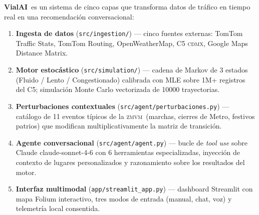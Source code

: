 \documentclass[11pt,a4paper]{article}
\newcommand{\VialAI}{\textbf{\textcolor{vialTeal}{Vial}\textcolor{vialAmber}{AI}}}
\newcommand{\ZMVM}{\textsc{zmvm}}
\newcommand{\CDMX}{\textsc{cdmx}}
\begin{document}
\VialAI\ es un sistema de cinco capas que transforma datos de tráfico
en tiempo real en una recomendación conversacional:

\begin{keybox}
\begin{enumerate}
\item \textbf{Ingesta de datos} (\texttt{src/ingestion/}) ---
cinco fuentes externas: TomTom Traffic Stats, TomTom Routing,
OpenWeatherMap, C5 \CDMX, Google Maps Distance Matrix.
\item \textbf{Motor estocástico} (\texttt{src/simulation/}) ---
cadena de Markov de 3 estados (Fluido / Lento / Congestionado)
calibrada con MLE sobre \num{1}M+ registros del C5; simulación
Monte Carlo vectorizada de \num{10000} trayectorias.
\item \textbf{Perturbaciones contextuales} (\texttt{src/agent/perturbaciones.py}) ---
catálogo de 11 eventos típicos de la \ZMVM\ (marchas, cierres de
Metro, festivos patrios) que modifican multiplicativamente la
matriz de transición.
\item \textbf{Agente conversacional} (\texttt{src/agent/agent.py}) ---
bucle de \emph{tool use} sobre Claude claude-sonnet-4-6 con 6 herramientas
especializadas, inyección de contexto de lugares personalizados y
razonamiento sobre los resultados del motor.
\item \textbf{Interfaz multimodal} (\texttt{app/streamlit\_app.py}) ---
dashboard Streamlit con mapa Folium interactivo, tres modos de
entrada (manual, chat, voz) y telemetría local consentida.
\end{enumerate}
\end{keybox}
\end{document}
